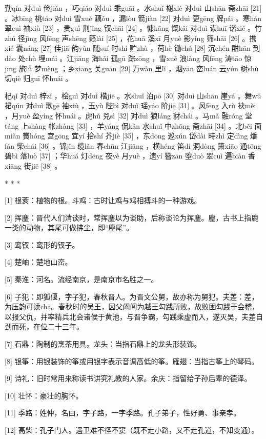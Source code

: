 \documentclass[12pt,UTF8]{ctexbook}
\begin{document}
勤qín 对duì 俭jiǎn ，巧qiǎo 对duì 乖guāi 。水shuǐ 榭xiè 对duì 山shān 斋zhāi [21] 。冰bīng 桃táo 对duì 雪xuě 藕ǒu ，漏lòu 箭jiàn [22] 对duì 更gēng 牌pái 。寒hán 翠cuì 袖xiù [23] ，贵guì 荆jīng 钗chāi [24] 。慷kāng 慨kǎi 对duì 诙huī 谐xié 。竹zhú 径jìng 风fēng 声shēng 籁lài [25] ，花huā 溪xī 月yuè 影yǐng 筛shāi [26] 。携xié 囊náng [27] 佳jiā 韵yùn 随suí 时shí 贮zhù ，荷hè 锄chú [28] 沉chén 酣hān 到dào 处chù 埋mái 。江jiāng 海hǎi 孤gū 踪zōng ，雪xuě 浪làng 风fēng 涛tāo 惊jīng 旅lǚ 梦mèng ；乡xiāng 关guān [29] 万wàn 里lǐ ，烟yān 峦luán 云yún 树shù 切qiè 归guī 怀huái 。

杞qǐ 对duì 梓zǐ ，桧guì 对duì 楷jiē 。水shuǐ 泊pō [30] 对duì 山shān 崖yá 。舞wǔ 裙qún 对duì 歌gē 袖xiù ，玉yù 陛bì 对duì 瑶yáo 阶jiē [31] 。风fēng 入rù 袂mèi ，月yuè 盈yíng 怀huái 。虎hǔ 兕sì [32] 对duì 狼láng 豺chái 。马mǎ 融róng 堂táng 上shàng 帐zhàng [33] ，羊yáng 侃kǎn 水shuǐ 中zhōng 斋zhāi [34] 。北běi 面miàn 黉hóng 宫gōng 宜yí 拾shí 芥jiè [35] ，东dōng 巡xún 岱dài 畤zhì 定dìng 燔fán 柴chái [36] 。锦jǐn 缆lǎn 春chūn 江jiāng ，横héng 笛dí 洞dòng 箫xiāo 通tōng 碧bì 落luò [37] ；华huá 灯dēng 夜yè 月yuè ，遗yí 簪zān 堕duò 翠cuì 遍biàn 香xiāng 街jiē [38] 。



* * *



[1] 根荄：植物的根。斗鸡：古时让鸡与鸡相搏斗的一种游戏。

[2] 挥麈：晋代人们清谈时，常挥麈以为谈助，后称谈论为挥麈。麈，古书上指鹿一类的动物，其尾可做拂尘，即“麈尾”。

[3] 鸾钗：鸾形的钗子。

[4] 楚岫：楚地山峦。

[5] 秦淮：河名。流经南京，是南京市名胜之一。

[6] 子犯：即狐偃，字子犯，春秋晋人。为晋文公舅，故亦称为舅犯。夫差：差，为压韵可读chā。春秋时的吴王，因父阖闾为越王勾践所败，故败困勾践于会稽，以报父仇，并率精兵北会诸侯于黄池，与晋争霸，勾践乘虚而入，遂灭吴，夫差自刭而死，在位二十三年。

[7] 石鼎：陶制的烹茶用具。龙头：当指石鼎上的龙头形装饰。

[8] 银筝：用银装饰的筝或用银字表示音调高低的筝。雁翅：当指古筝上的琴码。

[9] 诗礼：旧时常用来称读书讲究礼教的人家。余庆：指留给子孙后辈的德泽。

[10] 壮怀：豪壮的胸怀。

[11] 季路：姓仲，名由，字子路，一字季路。孔子弟子，性好勇、事亲孝。

[12] 高柴：孔子门人。遇卫难不径不窦（既不走小路，又不走孔道，不知变通）。
\end{document}
